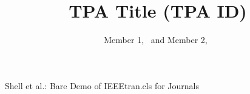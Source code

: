 \documentclass[journal]{IEEEtran}
\begin{document}
%
\title{TPA Title (TPA ID)}
%
%
%

\author{Member 1,~
        and Member 2,~
}

% 
%



%
{Shell \MakeLowercase{{et al.}}: Bare Demo of IEEEtran.cls for Journals}
% 




\end{document}

